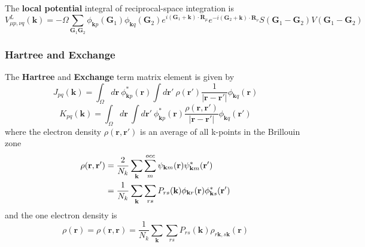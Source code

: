 \documentclass{article}
\begin{document}
            The \textbf{local potential} integral of reciprocal-space integration is
            \begin{equation}
                V_{\mu p,\nu q}^L(\textbf{k}) = -\Omega\sum_{\textbf{G}_1\textbf{G}_2}\phi_{\textbf{k}p}(\textbf{G}_1)\phi_{\textbf{k}q}(\textbf{G}_2)
                e^{i(\textbf{G}_1+\textbf{k})\cdot\textbf{R}_{\mu}}e^{-i(\textbf{G}_2+\textbf{k})\cdot\textbf{R}_{\nu}}S(\textbf{G}_1-\textbf{G}_2)V(\textbf{G}_1-\textbf{G}_2)
            \end{equation}         
            
            
        \subsubsection{Hartree and Exchange}
            The \textbf{Hartree} and \textbf{Exchange} term matrix element\cite{McClain2017} is given by
            \begin{equation}
                J_{pq}(\textbf{k}) = \int_{\Omega}d\textbf{r}\ \phi_{\textbf{k}p}^*(\textbf{r})
                \int d\textbf{r}'\ \rho(\textbf{r}')\frac{1}{\left|\textbf{r}-\textbf{r}'\right|}\phi_{\textbf{k}q}(\textbf{r})\label{hartree}
            \end{equation}
            \begin{equation}
                K_{pq}(\textbf{k}) = \int_{\Omega}d\textbf{r}\ \int d\textbf{r}'\ \phi_{\textbf{k}p}^*(\textbf{r})
                \frac{\rho(\textbf{r},\textbf{r}')}{\left|\textbf{r}-\textbf{r}'\right|}\phi_{\textbf{k}q}(\textbf{r}')\label{exchange}
            \end{equation}
            where the electron density $\rho(\textbf{r},\textbf{r}')$ is an average of all k-points in the Brillouin zone
            \begin{align}
                \rho(\textbf{r},\textbf{r}') &= \frac{2}{N_k}\sum_{\textbf{k}}\sum_m^{occ}\psi_{\textbf{k}m}(\textbf{r})\psi_{\textbf{k}m}^*(\textbf{r}')\notag\\
                &= \frac{1}{N_k}\sum_{\textbf{k}}\sum_{rs}P_{rs}(\textbf{k})\phi_{\textbf{k}r}(\textbf{r})
                    \phi_{\textbf{k}s}^*(\textbf{r}')
            \end{align}
            and the one electron density is
            \begin{equation}
                \rho(\textbf{r}) = \rho(\textbf{r},\textbf{r}) = \frac{1}{N_k}\sum_{\textbf{k}}\sum_{rs}
                P_{rs}(\textbf{k})\rho_{r\textbf{k},s\textbf{k}}(\textbf{r})
            \end{equation}
\end{document}
